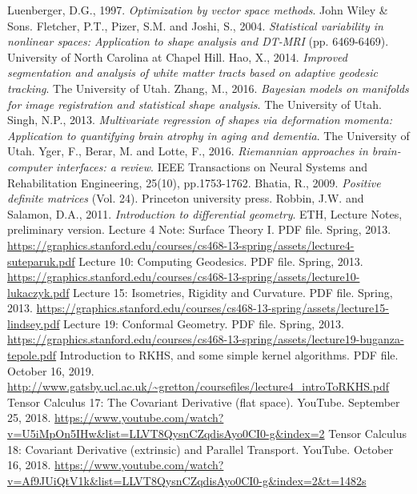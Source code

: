 \documentclass[a4paper]{article}
\theoremstyle{definition}
\theoremstyle{plain}
\begin{document}
\newpage
\begin{thebibliography}{99} 
Luenberger, D.G., 1997. \textit{Optimization by vector space methods}. John Wiley \& Sons.
Fletcher, P.T., Pizer, S.M. and Joshi, S., 2004. \textit{Statistical variability in nonlinear spaces: Application to shape analysis and DT-MRI} (pp. 6469-6469). University of North Carolina at Chapel Hill.
Hao, X., 2014. \textit{Improved segmentation and analysis of white matter tracts based on adaptive geodesic tracking}. The University of Utah.
Zhang, M., 2016. \textit{Bayesian models on manifolds for image registration and statistical shape analysis}. The University of Utah.
Singh, N.P., 2013. \textit{Multivariate regression of shapes via deformation momenta: Application to quantifying brain atrophy in aging and dementia}. The University of Utah.
Yger, F., Berar, M. and Lotte, F., 2016. \textit{Riemannian approaches in brain-computer interfaces: a review}. IEEE Transactions on Neural Systems and Rehabilitation Engineering, 25(10), pp.1753-1762.
Bhatia, R., 2009. \textit{Positive definite matrices} (Vol. 24). Princeton university press.
Robbin, J.W. and Salamon, D.A., 2011. \textit{Introduction to differential geometry}. ETH, Lecture Notes, preliminary version.
 Lecture 4 Note: Surface Theory I. PDF file. Spring, 2013. \url{https://graphics.stanford.edu/courses/cs468-13-spring/assets/lecture4-suteparuk.pdf}
 Lecture 10: Computing Geodesics. PDF file. Spring, 2013. \url{https://graphics.stanford.edu/courses/cs468-13-spring/assets/lecture10-lukaczyk.pdf}
 Lecture 15: Isometries, Rigidity and Curvature. PDF file. Spring, 2013. \url{https://graphics.stanford.edu/courses/cs468-13-spring/assets/lecture15-lindsey.pdf}
 Lecture 19: Conformal Geometry. PDF file. Spring, 2013. \url{https://graphics.stanford.edu/courses/cs468-13-spring/assets/lecture19-buganza-tepole.pdf}
 Introduction to RKHS, and some simple kernel
algorithms. PDF file. October 16, 2019. \url{http://www.gatsby.ucl.ac.uk/~gretton/coursefiles/lecture4_introToRKHS.pdf}
 Tensor Calculus 17: The Covariant Derivative (flat space). YouTube. September 25, 2018. \url{https://www.youtube.com/watch?v=U5iMpOn5IHw&list=LLVT8QysnCZqdisAyo0CI0-g&index=2}
 Tensor Calculus 18: Covariant Derivative (extrinsic) and Parallel Transport. YouTube. October 16, 2018. \url{https://www.youtube.com/watch?v=Af9JUiQtV1k&list=LLVT8QysnCZqdisAyo0CI0-g&index=2&t=1482s}

\end{thebibliography}
\end{document}
